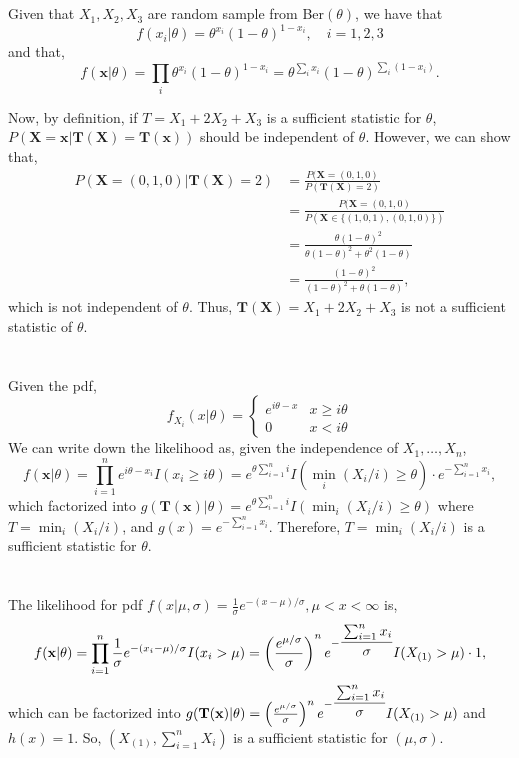 \documentclass[letterpaper]{article}
\newcommand{\bx}{\mathbf{x}}
\newcommand{\bX}{\mathbf{X}}
\newcommand{\Tx}{\mathbf{T(x)}}
\newcommand{\TX}{\mathbf{T(X)}}
\begin{document}
    \section{}
        Given that $X_1, X_2, X_3$ are random sample from Ber$(\theta)$, we have that
        \[
        f(x_i|\theta) = \theta^{x_i} (1-\theta)^{1-x_i}, \quad i = 1, 2, 3
        \]
        and that,
        \[
        f(\bx|\theta) = \prod_i \theta^{x_i} (1-\theta)^{1-x_i} = \theta^{\sum_i x_i} (1-\theta)^{\sum_i (1-x_i)}.
        \]

        Now, by definition, if $T = X_1 + 2 X_2 + X_3$ is a sufficient statistic for $\theta$, $P(\bX = \bx|\TX=\Tx)$ should be independent of $\theta$. However, we can show that,
        \begin{align*}
        P(\bX = (0, 1, 0)|\TX = 2) & = \frac{P(\bX = (0, 1, 0)}{P(\TX = 2)} \\
        & = \frac{P(\bX = (0, 1, 0)}{P(\bX \in \{(1, 0, 1), (0, 1, 0)\})} \\
        & = \frac{\theta (1-\theta)^2}{\theta(1-\theta)^2 + \theta^2(1-\theta)} \\
        & = \frac{(1-\theta)^2}{(1-\theta)^2 + \theta(1-\theta)},
        \end{align*}
        which is not independent of $\theta$. Thus, $\TX = X_1 + 2X_2 + X_3$ is not a sufficient statistic of $\theta$.

    \section{}
        Given the pdf,
        \[
        f_{X_i}(x|\theta) = \begin{cases}
            e^{i\theta-x} & x \ge i\theta \\
            0   & x < i\theta
        \end{cases}
        \]
        We can write down the likelihood as, given the independence of $X_1, \dots, X_n$,
        \[
        f(\bx|\theta) = \prod_{i=1}^n e^{i\theta-x_i} I(x_i \ge i\theta) 
        = e^{\theta \sum_{i=1}^n i} I(\min_{i}(X_i/i) \ge \theta) \cdot e^{-\sum_{i=1}^n x_i},
        \]
        which factorized into $g(\Tx|\theta) = e^{\theta \sum_{i=1}^n i} I(\min_{i}(X_i/i) \ge \theta)$ where $T = \min_{i} (X_i/i)$, and $g(x) = e^{-\sum_{i=1}^n x_i}$. Therefore, $T = \min_{i} (X_i/i)$ is a sufficient statistic for $\theta$.
    \section{}
        The likelihood for pdf $f(x|\mu, \sigma) = \frac{1}{\sigma} e^{-(x-\mu)/\sigma}, \mu < x < \infty$ is,
        \[
        f(\bx|\theta) = \prod_{i=1}^n \frac{1}{\sigma} e^{-(x_i - \mu)/\sigma} I(x_i > \mu) = \left(\frac{e^{\mu/\sigma}}{\sigma}\right)^n e^{-\cfrac{\sum_{i=1}^n x_i}{\sigma}} I(X_{(1)} > \mu) \cdot 1,
        \]
        which can be factorized into $g(\Tx|\theta) = \left(\frac{e^{\mu/\sigma}}{\sigma}\right)^n e^{-\cfrac{\sum_{i=1}^n x_i}{\sigma}} I(X_{(1)} > \mu)$ and $h(x) = 1$. 
        So, $(X_{(1)}, \sum_{i=1}^n X_i)$ is a sufficient statistic for $(\mu, \sigma)$.
\end{document}

